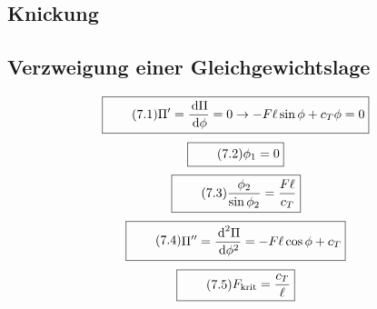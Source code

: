 \documentclass[11pt]{article}
\newcommand{\1}{ {\mathds{1}} }
\newcommand{\td}{\,\text{d}}
\begin{document}
\begin{multicols}{2}
		\section{Knickung}
		\subsection{Verzweigung einer Gleichgewichtslage}
		\begin{equation}
			\boxed{
				\tag{7.1}
				\begin{split}
					\Pi' = \frac{\td \Pi}{\td \phi} = 0
					\rightarrow
					-F\ell \sin \phi + c_T \phi = 0
				\end{split}
			}
		\end{equation}
		\begin{equation}
			\boxed{
				\tag{7.2}
				\begin{split}
					\phi_1 = 0
				\end{split}
			}
		\end{equation}
		\begin{equation}
			\boxed{
				\tag{7.3}
				\begin{split}
					\frac{\phi_2}{\sin \phi_2} = \frac{F \ell}{c_T}
				\end{split}
			}
		\end{equation}
		\begin{equation}
			\boxed{
				\tag{7.4}
				\begin{split}
					\Pi'' = \frac{\td^2 \Pi}{\td \phi^2} = -F\ell \cos \phi + c_T
				\end{split}
			}
		\end{equation}
		\begin{equation}
			\boxed{
				\tag{7.5}
				\begin{split}
					F_{\text{krit}} = \frac{c_T}{\ell}
				\end{split}
			}
		\end{equation}
		

\end{multicols}
\end{document}
